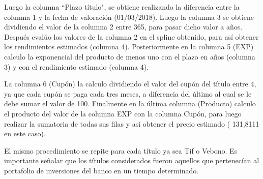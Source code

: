 \hspace{0.4cm} Luego la columna ``Plazo t\'itulo", se obtiene realizando la diferencia entre la columna 1 y la fecha de valoraci\'on (01/03/2018). Luego la columna 3 se obtiene dividiendo el valor de la columna 2 entre 365, para pasar dicho valor a a\~nos. Despu\'es eval\'uo los valores de la columna 2 en el spline obtenido, para as\'i obtener los rendimientos estimados (columna 4). Posteriormente en la columna 5 (EXP) calculo la exponencial del producto de menos uno con el plazo en a\~nos (columna 3) y con el rendimiento estimado (columna 4).

\vspace{0.5cm}

\hspace{0.4cm} La columna 6 (Cup\'on) la calculo dividiendo el valor del cup\'on del t\'itulo entre 4, ya que cada cup\'on se paga cada tres meses, a diferencia del \'ultimo al cual se le debe sumar el valor de 100. Finalmente en la \'ultima columna (Producto) calculo el producto del valor de la columna EXP con la columna Cup\'on, para luego realizar la sumatoria de todas sus filas y as\'i obtener el precio estimado ( 131,8111 en este caso).

\vspace{0.5cm}

\hspace{0.4cm}El mismo procedimiento se repite para cada t\'itulo ya sea Tif o Vebono. Es importante se\~nalar que los t\'itulos considerados fueron aquellos que pertenec\'ian al portafolio de inversiones del banco en un tiempo determinado.





